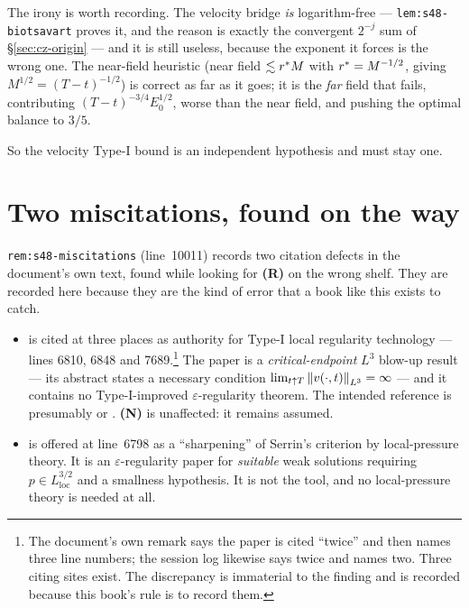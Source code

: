 The irony is worth recording. The velocity bridge \emph{is} logarithm-free ---
\texttt{lem:s48-biotsavart} proves it, and the reason is exactly the
convergent \(2^{-j}\) sum of \S\ref{sec:cz-origin} --- and it is still
useless, because the exponent it forces is the wrong one. The near-field
heuristic (near field \(\lesssim r^{*} M\) with \(r^{*}=M^{-1/2}\), giving
\(M^{1/2}=(T-t)^{-1/2}\)) is correct as far as it goes; it is the \emph{far}
field that fails, contributing \((T-t)^{-3/4}E_0^{1/2}\), worse than the near
field, and pushing the optimal balance to \(3/5\).

So the velocity Type-I bound is an independent hypothesis and must stay one.

\section{Two miscitations, found on the way}
\label{sec:cz-miscitations}

\texttt{rem:s48-miscitations} (line~10011) records two citation defects in the
document's own text, found while looking for \textbf{(R)} on the wrong shelf.
They are recorded here because they are the kind of error that a book like
this exists to catch.

\begin{itemize}[leftmargin=1.6em]
\item \cite{Seregin2012} is cited at three places as authority for Type-I
  local regularity technology --- lines 6810, 6848 and 7689.\footnote{The
  document's own remark says the paper is cited ``twice'' and then names three
  line numbers; the session log likewise says twice and names two. Three
  citing sites exist. The discrepancy is immaterial to the finding and is
  recorded because this book's rule is to record them.} The paper is a
  \emph{critical-endpoint} \(L^3\) blow-up result --- its abstract states a
  necessary condition \(\lim_{t\uparrow T}\left\|v(\cdot,t)\right\|_{L^3}=\infty\) ---
  and it contains no Type-I-improved \(\varepsilon\)-regularity theorem. The
  intended reference is presumably \cite{SereginSverak2009} or
  \cite{AlbrittonBarker2019}. \textbf{(N)} is unaffected: it remains assumed.
\item \cite{LadyzhenskayaSeregin1999} is offered at line~6798 as a
  ``sharpening'' of Serrin's criterion by local-pressure theory. It is an
  \(\varepsilon\)-regularity paper for \emph{suitable} weak solutions requiring
  \(p\in L^{3/2}_{\mathrm{loc}}\) and a smallness hypothesis. It is not the
  tool, and no local-pressure theory is needed at all.
\end{itemize}

